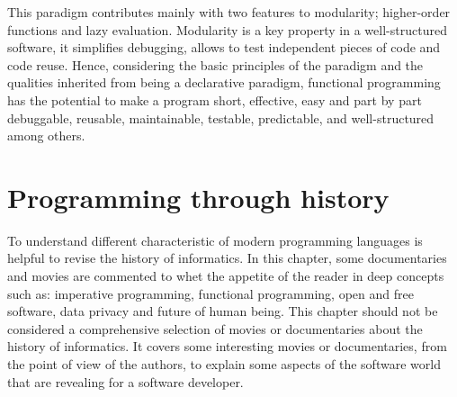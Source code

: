 This paradigm contributes mainly with two features to modularity; higher-order functions and lazy evaluation. %
Modularity is a key property in a well-structured software, it simplifies debugging, allows to test independent pieces of code and code reuse.  
Hence, considering the basic principles of the paradigm and the qualities inherited from being a declarative paradigm,
functional programming has the potential to make a program 
short, effective, easy and part by part debuggable, reusable, maintainable, testable, predictable, and well-structured among others. 




 

 
 
% 
% 




\newpage 
\section{Programming through history}   \label{sec:films}
To understand different characteristic of modern programming languages
is helpful to revise the history of informatics. In this chapter, 
some documentaries and movies are commented to whet the appetite of the 
reader in deep concepts such as: imperative programming, functional programming, 
open and free software, data privacy and future of human being. 
This chapter should not be considered  a comprehensive selection of movies 
or documentaries about the history of informatics. 
It covers some interesting movies or documentaries, 
from the point of view of the authors, to explain some aspects 
of the software world that are revealing for a software 
developer.  
  

